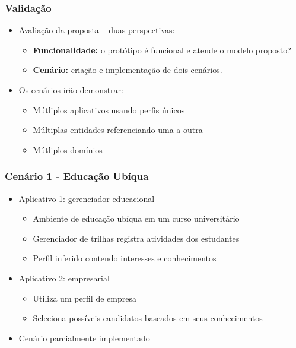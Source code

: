 \documentclass[14pt]{beamer}
\begin{document}
\begin{frame}
  \frametitle{Validação}
  \begin{itemize}
    \item Avaliação da proposta -- duas perspectivas:
    \begin{itemize}
      \item {\bf Funcionalidade:} o protótipo é funcional e atende o modelo proposto?
      \item {\bf Cenário:} criação e implementação de dois cenários.
    \end{itemize}
  \end{itemize}

	\begin{itemize}
		\item Os cenários irão demonstrar:
		\begin{itemize}
			\item Mútliplos aplicativos usando perfis únicos
			\item Múltiplas entidades referenciando uma a outra
			\item Mútliplos domínios
		\end{itemize}
	\end{itemize}

\end{frame}


\begin{frame}
	\frametitle{Cenário 1 - Educação Ubíqua}

	\begin{itemize}
		\item Aplicativo 1: gerenciador educacional
		\begin{itemize}
			\item Ambiente de educação ubíqua em um curso universitário
			\item Gerenciador de trilhas registra atividades dos estudantes
			\item Perfil inferido contendo interesses e conhecimentos
		\end{itemize}
		\item Aplicativo 2: empresarial
		\begin{itemize}
			\item Utiliza um perfil de empresa
			\item Seleciona possíveis candidatos baseados em seus conhecimentos
		\end{itemize}
		\item Cenário parcialmente implementado
	\end{itemize}
\end{frame}
\end{document}
